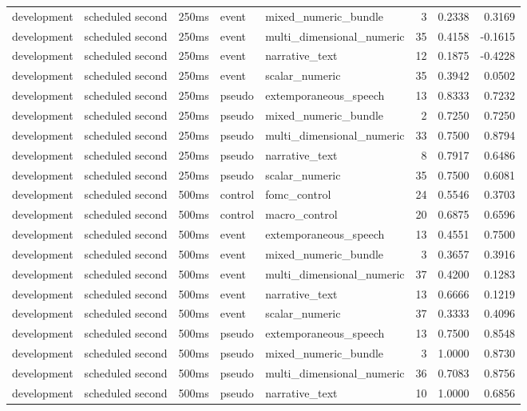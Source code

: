 \begin{tabular}{lllllrrr}
development & scheduled second & 250ms & event & mixed_numeric_bundle & 3 & 0.2338 & 0.3169 \\
development & scheduled second & 250ms & event & multi_dimensional_numeric & 35 & 0.4158 & -0.1615 \\
development & scheduled second & 250ms & event & narrative_text & 12 & 0.1875 & -0.4228 \\
development & scheduled second & 250ms & event & scalar_numeric & 35 & 0.3942 & 0.0502 \\
development & scheduled second & 250ms & pseudo & extemporaneous_speech & 13 & 0.8333 & 0.7232 \\
development & scheduled second & 250ms & pseudo & mixed_numeric_bundle & 2 & 0.7250 & 0.7250 \\
development & scheduled second & 250ms & pseudo & multi_dimensional_numeric & 33 & 0.7500 & 0.8794 \\
development & scheduled second & 250ms & pseudo & narrative_text & 8 & 0.7917 & 0.6486 \\
development & scheduled second & 250ms & pseudo & scalar_numeric & 35 & 0.7500 & 0.6081 \\
development & scheduled second & 500ms & control & fomc_control & 24 & 0.5546 & 0.3703 \\
development & scheduled second & 500ms & control & macro_control & 20 & 0.6875 & 0.6596 \\
development & scheduled second & 500ms & event & extemporaneous_speech & 13 & 0.4551 & 0.7500 \\
development & scheduled second & 500ms & event & mixed_numeric_bundle & 3 & 0.3657 & 0.3916 \\
development & scheduled second & 500ms & event & multi_dimensional_numeric & 37 & 0.4200 & 0.1283 \\
development & scheduled second & 500ms & event & narrative_text & 13 & 0.6666 & 0.1219 \\
development & scheduled second & 500ms & event & scalar_numeric & 37 & 0.3333 & 0.4096 \\
development & scheduled second & 500ms & pseudo & extemporaneous_speech & 13 & 0.7500 & 0.8548 \\
development & scheduled second & 500ms & pseudo & mixed_numeric_bundle & 3 & 1.0000 & 0.8730 \\
development & scheduled second & 500ms & pseudo & multi_dimensional_numeric & 36 & 0.7083 & 0.8756 \\
development & scheduled second & 500ms & pseudo & narrative_text & 10 & 1.0000 & 0.6856 \\

\end{tabular}
